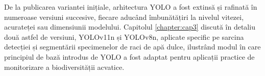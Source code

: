 De la publicarea variantei inițiale, arhitectura YOLO a fost extinsă și rafinată în numeroase versiuni succesive, fiecare aducând îmbunătățiri la nivelul vitezei, acurateței sau dimensiunii modelului. Capitolul \ref{chapter:cap3} discută în detaliu două astfel de versiuni, YOLOv11n și YOLOv8n, aplicate specific pe sarcina detecției și segmentării specimenelor de raci de apă dulce, ilustrând modul în care principiul de bază introdus de YOLO a fost adaptat pentru aplicații practice de monitorizare a biodiversității acvatice.












